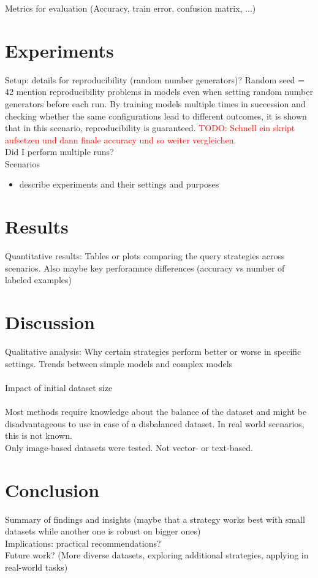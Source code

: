 \documentclass{article}
\theoremstyle{plain}
\theoremstyle{definition}
\theoremstyle{remark}
\begin{document}
Metrics for evaluation (Accuracy, train error, confusion matrix, ...)

\section{Experiments}\label{sec:experiments}
Setup: details for reproducibility (random number generators)?
Random seed = 42
\cite{comparableactivelearning} mention reproducibility problems in models even when setting random number generators before each run. By training models multiple times in succession and checking whether the same configurations lead to different outcomes, it is shown that in this scenario, reproducibility is guaranteed. \textcolor{red}{TODO: Schnell ein skript aufsetzen und dann finale accuracy und so weiter vergleichen.}
\\
Did I perform multiple runs?
\\

Scenarios
\begin{itemize}
	\item describe experiments and their settings and purposes
\end{itemize}

\section{Results}\label{sec:results}
Quantitative results: Tables or plots comparing the query strategies across scenarios. Also maybe key perforamnce differences (accuracy vs number of labeled examples)

\section{Discussion}\label{sec:discussion}
Qualitative analysis: Why certain strategies perform better or worse in specific settings. Trends between simple models and complex models
\\
\\
Impact of initial dataset size
\\
\\
Most methods require knowledge about the balance of the dataset and might be disadvantageous to use in case of a disbalanced dataset. In real world scenarios, this is not known. \\
Only image-based datasets were tested. Not vector- or text-based. 

\section{Conclusion}\label{sec:conclusion}
Summary of findings and insights (maybe that a strategy works best with small datasets while another one is robust on bigger ones)
\\
Implications: practical recommendations?
\\
Future work? (More diverse datasets, exploring additional strategies, applying in real-world tasks)
\end{document}
